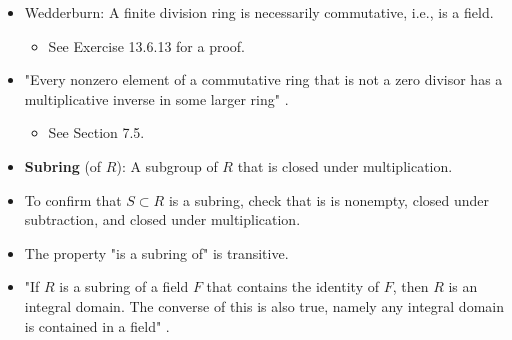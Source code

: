 \documentclass[../notes.tex]{subfiles}
\begin{document}
\begin{itemize}
\begin{proposition}
        In particular, if $a,b,c$ are any elements of an integral domain and $ab=ac$, then either $a=0$ or $b=c$.
        \begin{proof}
            $ab=ac$ implies $a(b-c)=0$. Thus, since $a$ is not a zero divisor, either $a=0$ or $b-c=0$ (equivalently, $b=c$).
        \end{proof}
    \end{proposition}
    \begin{corollary}\label{cly:7.3}
        Any finite integral domain is a field.
        \begin{proof}
            Let $R$ be a finite integral domain, and $a$ be an arbitrary, nonzero element of $R$. We seek to find $b$ such that $ab=1$, which will imply that $a$ (i.e., every element) is a unit in $R$.\par
            Define the map $x\mapsto ax$. By the cancellation law, this map is injective. Injectivity plus the fact that $R$ is finite proves that this map is surjective. Thus, there exists $b\in R$ such that $ab=1$, as desired.
        \end{proof}
    \end{corollary}
    \item Wedderburn: A finite division ring is necessarily commutative, i.e., is a field.
    \begin{itemize}
        \item See Exercise 13.6.13 for a proof.
    \end{itemize}
    \item "Every nonzero element of a commutative ring that is not a zero divisor has a multiplicative inverse in some larger ring" \parencite[228]{bib:DummitFoote}.
    \begin{itemize}
        \item See Section 7.5.
    \end{itemize}
    \item \textbf{Subring} (of $R$): A subgroup of $R$ that is closed under multiplication.
    \item To confirm that $S\subset R$ is a subring, check that is is nonempty, closed under subtraction, and closed under multiplication.
    \item The property "is a subring of" is transitive.
    \item "If $R$ is a subring of a field $F$ that contains the identity of $F$, then $R$ is an integral domain. The converse of this is also true, namely any integral domain is contained in a field" \parencite[229]{bib:DummitFoote}.

\end{itemize}
\end{document}
